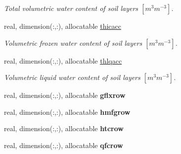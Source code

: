 \begin{DoxyCompactItemize}
\begin{DoxyCompactList}\small\item\em Total volumetric water content of soil layers $[m^3 m^{-3} ]$. \end{DoxyCompactList}\item 
\hypertarget{structclass__statevars_1_1class__rotated_a6f02d4e44eb714a10344985070267e65}{}real, dimension(\+:,\+:), allocatable \hyperlink{structclass__statevars_1_1class__rotated_a6f02d4e44eb714a10344985070267e65}{thicacc}\label{structclass__statevars_1_1class__rotated_a6f02d4e44eb714a10344985070267e65}

\begin{DoxyCompactList}\small\item\em Volumetric frozen water content of soil layers $[m^3 m^{-3} ]$. \end{DoxyCompactList}\item 
\hypertarget{structclass__statevars_1_1class__rotated_aacfaf305510794c758551a3bfbfb96c1}{}real, dimension(\+:,\+:), allocatable \hyperlink{structclass__statevars_1_1class__rotated_aacfaf305510794c758551a3bfbfb96c1}{thlqacc}\label{structclass__statevars_1_1class__rotated_aacfaf305510794c758551a3bfbfb96c1}

\begin{DoxyCompactList}\small\item\em Volumetric liquid water content of soil layers $[m^3 m^{-3} ]$. \end{DoxyCompactList}\item 
\hypertarget{structclass__statevars_1_1class__rotated_af80d7fe30d07c6042f1eebf50c6f5e56}{}real, dimension(\+:,\+:), allocatable {\bfseries gflxrow}\label{structclass__statevars_1_1class__rotated_af80d7fe30d07c6042f1eebf50c6f5e56}

\item 
\hypertarget{structclass__statevars_1_1class__rotated_aba79dc5db081dfdaa6baf1e76b1f1a0a}{}real, dimension(\+:,\+:), allocatable {\bfseries hmfgrow}\label{structclass__statevars_1_1class__rotated_aba79dc5db081dfdaa6baf1e76b1f1a0a}

\item 
\hypertarget{structclass__statevars_1_1class__rotated_a3cfb3b6b7d2cf6ab19e4d6d78ac52dcc}{}real, dimension(\+:,\+:), allocatable {\bfseries htcrow}\label{structclass__statevars_1_1class__rotated_a3cfb3b6b7d2cf6ab19e4d6d78ac52dcc}

\item 
\hypertarget{structclass__statevars_1_1class__rotated_a7de0f9be4bce5ea79a4b624401e31516}{}real, dimension(\+:,\+:), allocatable {\bfseries qfcrow}\label{structclass__statevars_1_1class__rotated_a7de0f9be4bce5ea79a4b624401e31516}


\end{DoxyCompactItemize}
